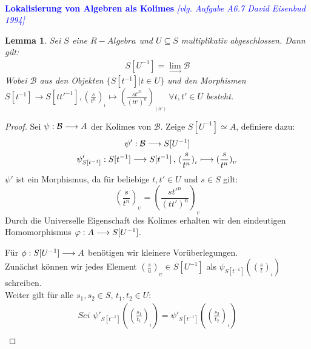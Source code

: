 \documentclass[10pt,a4paper]{report}
\newcommand{\comment}[1]{}
\newcommand{\ModulsOfDifferenzials}{David Eisenbud 1994}
\newcounter{Aussage}[chapter]
\newtheorem{lemma}[Aussage]{Lemma}
\newcommand{\functionfront}[3]{\nolinebreak{#1:#2 \longrightarrow #3}}
\newcommand{\function}[5]{\nolinebreak{#1:#2 \longrightarrow #3 \, , \, #4 \longmapsto #5}}
\newcommand{\lok}[2]{#1 [#2^{-1}]}
\newcommand{\loke}[3]{(\frac{#1}{#2})_{_{#3}}}
\newcommand{\colimes}[0]{\lim\limits_{ \longrightarrow }}
\begin{document}
\ \\
\textcolor{blue}{\textbf{Lokalisierung von Algebren als Kolimes} \textit{[vlg. Aufgabe A6.7 \ModulsOfDifferenzials]}}
\begin{lemma}\label{Lokalisierung von Algebren als Kolimes}
Sei $S$ eine $R-Algebra$ und $U \subseteq S$ multiplikativ abgeschlossen.
Dann gilt:
\begin{gather*}
 S[U^{-1}] = \colimes \mathcal{B}
\end{gather*}
Wobei $\mathcal{B}$ aus den Objekten $\lbrace \lok{S}{t} \vert t \in U \rbrace$ und den Morphismen\\
$\lok{S}{t} \longrightarrow \lok{S}{tt'}, \loke{s}{t^n}{t} \longmapsto \loke{st'^n}{(tt')^n}{(tt')} \,
\forall t,t' \in U$ besteht.\\
\end{lemma}
\begin{proof}
Sei $\functionfront{\psi}{\mathcal{B}}{A}$ der Kolimes von $\mathcal{B}$. Zeige $\lok{S}{U} \simeq A$, definiere dazu:
\begin{gather*}
\functionfront{\psi'}{\mathcal{B}}{\lok{S}{U}}\\
\function{\psi'_{\lok{S}{t}}}{\lok{S}{t}}{\lok{S}{t}}{\loke{s}{t^n}{t}}{\loke{s}{t^n}{U}}
\end{gather*}
$\psi'$ ist ein Morphismus, da für beliebige $t,t' \in U$ und $s \in S$ gilt:
$$\loke{s}{t^n}{U} = \loke{st'^n}{(tt')^n}{U}$$
Durch die Universelle Eigenschaft des Kolimes erhalten wir den eindeutigen Homomorphismus $\functionfront{\varphi}{A}{\lok{S}{U}}$.
\begin{center}
\end{center}
Für $\functionfront{\phi}{S[U^{-1}]}{A}$ benötigen wir kleinere Vorüberlegungen.\\
Zunächst können wir jedes Element $\loke{s}{u}{U} \in \lok{S}{U}$ als $\psi_{\lok{S}{t}}(\loke{s}{t}{t})$ schreiben.\\
\comment{\label{wobei u = t}}
Weiter gilt für alle $s_1,s_2 \in S , \, t_1,t_2 \in U$: 
\begin{align*}
\textit{Sei }\psi'_{\lok{S}{t}}(\loke{s_1}{t_1}{t}) = \psi'_{\lok{S}{t}}(\loke{s_2}{t_2}{t})\\

\end{align*}
\end{proof}
\end{document}
